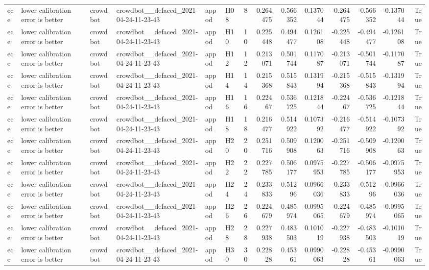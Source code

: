 \begin{longtable}{llllllrrrrrrrr}
ece & lower calibration error is better & crowdbot & crowdbot\_\_defaced\_2021-04-24-11-23-43 & appod & H08 & 8 & 0.264475 & 0.566352 & 0.137044 & -0.264475 & -0.566352 & -0.137044 & True \\
ece & lower calibration error is better & crowdbot & crowdbot\_\_defaced\_2021-04-24-11-23-43 & appod & H10 & 10 & 0.225448 & 0.494477 & 0.126108 & -0.225448 & -0.494477 & -0.126108 & True \\
ece & lower calibration error is better & crowdbot & crowdbot\_\_defaced\_2021-04-24-11-23-43 & appod & H12 & 12 & 0.213071 & 0.501744 & 0.117087 & -0.213071 & -0.501744 & -0.117087 & True \\
ece & lower calibration error is better & crowdbot & crowdbot\_\_defaced\_2021-04-24-11-23-43 & appod & H14 & 14 & 0.215368 & 0.515843 & 0.131994 & -0.215368 & -0.515843 & -0.131994 & True \\
ece & lower calibration error is better & crowdbot & crowdbot\_\_defaced\_2021-04-24-11-23-43 & appod & H16 & 16 & 0.22467 & 0.536725 & 0.121844 & -0.22467 & -0.536725 & -0.121844 & True \\
ece & lower calibration error is better & crowdbot & crowdbot\_\_defaced\_2021-04-24-11-23-43 & appod & H18 & 18 & 0.216477 & 0.514922 & 0.107392 & -0.216477 & -0.514922 & -0.107392 & True \\
ece & lower calibration error is better & crowdbot & crowdbot\_\_defaced\_2021-04-24-11-23-43 & appod & H20 & 20 & 0.251716 & 0.509908 & 0.120063 & -0.251716 & -0.509908 & -0.120063 & True \\
ece & lower calibration error is better & crowdbot & crowdbot\_\_defaced\_2021-04-24-11-23-43 & appod & H22 & 22 & 0.227785 & 0.506177 & 0.0975953 & -0.227785 & -0.506177 & -0.0975953 & True \\
ece & lower calibration error is better & crowdbot & crowdbot\_\_defaced\_2021-04-24-11-23-43 & appod & H24 & 24 & 0.233833 & 0.51296 & 0.0966036 & -0.233833 & -0.51296 & -0.0966036 & True \\
ece & lower calibration error is better & crowdbot & crowdbot\_\_defaced\_2021-04-24-11-23-43 & appod & H26 & 26 & 0.224679 & 0.485974 & 0.0995065 & -0.224679 & -0.485974 & -0.0995065 & True \\
ece & lower calibration error is better & crowdbot & crowdbot\_\_defaced\_2021-04-24-11-23-43 & appod & H28 & 28 & 0.227938 & 0.483503 & 0.101019 & -0.227938 & -0.483503 & -0.101019 & True \\
ece & lower calibration error is better & crowdbot & crowdbot\_\_defaced\_2021-04-24-11-23-43 & appod & H30 & 30 & 0.22828 & 0.45361 & 0.0990063 & -0.22828 & -0.45361 & -0.0990063 & True \\

\end{longtable}

